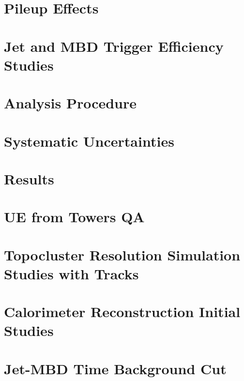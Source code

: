 \documentclass[type=report,linenumbering=on]{sphenix}
\begin{document}
\section{Pileup Effects}
\label{sec:pileup}


\section{Jet and MBD Trigger Efficiency Studies}
\label{sec:trigger_efficiency}


\clearpage
\section{Analysis Procedure}
\label{sec:analysis}


\section{Systematic Uncertainties}
\label{sec:systematic_uncertainties}


\clearpage
\section{Results}
\label{sec:results}


%

\clearpage


\clearpage


\section{UE from Towers QA}
\label{sec:UE_from_Towers_QA}


\clearpage

\section{Topocluster Resolution Simulation Studies with Tracks}
\label{sec:additional_topo_reso}


\clearpage

\section{Calorimeter Reconstruction Initial Studies}
\label{sec:initial_studies}


\clearpage

\section{Jet-MBD Time Background Cut}
\label{sec:jet_mbd_time_bkg_cut}

\end{document}
